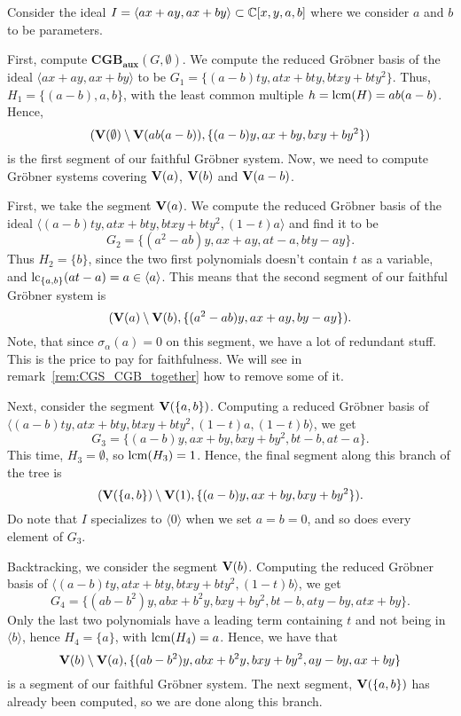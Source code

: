 \begin{example}\upshape
  Consider the ideal $I = \langle ax + ay, ax + by \rangle \subset \mathbb{C}[x, y, a, b]$ where we consider $a$ and $b$ to be parameters.

  First, compute $\mathbf{CGB_{aux}}(G, \emptyset)$. We compute the reduced Gröbner basis of the ideal $\langle ax + ay, ax + by \rangle$ to be
  $G_{1} = \{(a - b)ty, atx + bty, btxy + bty^{2} \}$. Thus, $H_{1} = \{(a - b), a, b\}$, with the least common multiple $h = \operatorname{lcm}(H) = ab(a - b)$. Hence,
  \[(\operatorname{\mathbf V}(\emptyset) \setminus \operatorname{\mathbf V}(ab(a - b)), \{(a - b)y, ax + by, bxy + by^{2}\})\]
  is the first segment of our faithful Gröbner system. Now, we need to compute Gröbner systems covering $\operatorname{\mathbf V}(a)$, $\operatorname{\mathbf V}(b)$ and $\operatorname{\mathbf V}(a - b)$.

  First, we take the segment $\operatorname{\mathbf V}(a)$. We compute the reduced Gröbner basis of the ideal $\langle (a - b)ty, atx + bty, btxy + bty^{2}, (1 - t)a \rangle$ and find it to be
  \[G_{2} = \{ (a^2 - ab)y, ax + ay, at - a, bty - ay\}.\]
  Thus $H_{2} = \{b\}$, since the two first polynomials doesn't contain $t$ as a variable, and $\operatorname{lc}_{\{a, b\}}(at - a) = a \in \langle a \rangle$. This means that the second segment of our faithful Gröbner system is
  \[(\operatorname{\mathbf V}(a) \setminus \operatorname{\mathbf V}(b),\{(a^2 - ab)y, ax + ay, by - ay\} ).\]
  Note, that since $\sigma_{\alpha}(a) = 0$ on this segment, we have a lot of redundant stuff. This is the price to pay for faithfulness. We will see in remark~\ref{rem:CGS_CGB_together} how to remove some of it.

  Next, consider the segment $\operatorname{\mathbf V}(\{a, b\})$. Computing a reduced Gröbner basis of $\langle (a - b)ty, atx + bty, btxy + bty^{2}, (1 - t)a, (1 - t)b \rangle$, we get
  \[G_{3} = \{ (a - b)y, ax + by, bxy + by^2, bt - b, at - a\}.\]
  This time, $H_{3} = \emptyset$, so $\operatorname{lcm}(H_{3}) = 1$. Hence, the final segment along this branch of the tree is
  \[(\operatorname{\mathbf V}(\{a, b\}) \setminus \operatorname{\mathbf V}(1), \{(a - b)y, ax + by, bxy + by^2\}).\]
  Do note that $I$ specializes to $\langle 0 \rangle$ when we set $a = b = 0$, and so does every element of $G_{3}$.

  Backtracking, we consider the segment $\operatorname{\mathbf V}(b)$. Computing the reduced Gröbner basis of $\langle (a - b)ty, atx + bty, btxy + bty^{2}, (1 - t)b \rangle$, we get
  \[G_{4} = \{(ab - b^{2})y, abx + b^{2}y, bxy + by^{2}, bt - b, aty - by, atx + by\}.\]
  Only the last two polynomials have a leading term containing $t$ and not being in $\langle b \rangle$, hence $H_{4} = \{a\}$, with $\operatorname{lcm}(H_{4}) = a$. Hence, we have that
  \[\operatorname{\mathbf V}(b) \setminus \operatorname{\mathbf V}(a), \{(ab - b^{2})y, abx + b^{2}y, bxy + by^{2}, ay - by, ax + by\}\]
  is a segment of our faithful Gröbner system. The next segment, $\operatorname{\mathbf V}(\{a, b\})$ has already been computed, so we are done along this branch.


\end{example}
